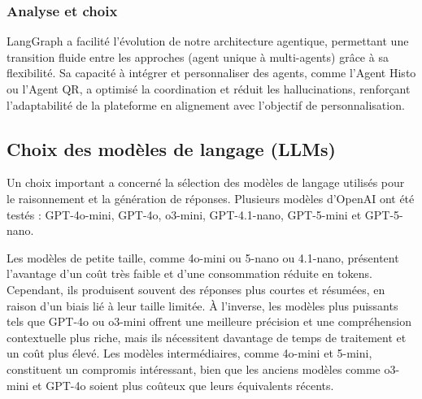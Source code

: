 \subsubsection{Analyse et choix}
\begin{table}[H]
\caption{Comparaison entre LangChain et LangGraph}
\centering{}
\label{table:chainVSgraph}
\end{table}

LangGraph a facilité l’évolution de notre architecture agentique, permettant une transition fluide entre les approches (agent unique à multi-agents) grâce à sa flexibilité. Sa capacité à intégrer et personnaliser des agents, comme l’Agent Histo ou l’Agent QR, a optimisé la coordination et réduit les hallucinations, renforçant l’adaptabilité de la plateforme en alignement avec l’objectif de personnalisation.

\subsection{Choix des modèles de langage (LLMs)}
Un choix important a concerné la sélection des modèles de langage utilisés pour le raisonnement et la génération de réponses. Plusieurs modèles d’OpenAI ont été testés : GPT-4o-mini, GPT-4o, o3-mini, GPT-4.1-nano, GPT-5-mini et GPT-5-nano.  

Les modèles de petite taille, comme 4o-mini ou 5-nano ou 4.1-nano, présentent l’avantage d’un coût très faible et d’une consommation réduite en tokens. Cependant, ils produisent souvent des réponses plus courtes et résumées, en raison d’un biais lié à leur taille limitée. À l’inverse, les modèles plus puissants tels que GPT-4o ou o3-mini offrent une meilleure précision et une compréhension contextuelle plus riche, mais ils nécessitent davantage de temps de traitement et un coût plus élevé. Les modèles intermédiaires, comme 4o-mini et 5-mini, constituent un compromis intéressant, bien que les anciens modèles comme o3-mini et GPT-4o soient plus coûteux que leurs équivalents récents.  

